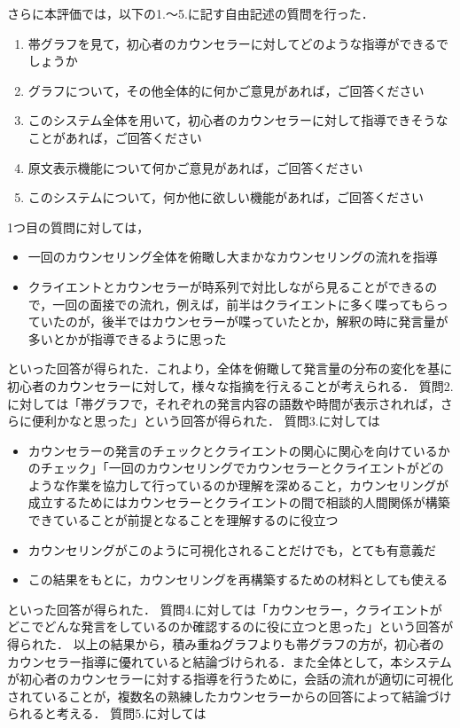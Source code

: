 \documentclass[shuuron]{kuee}
\begin{document}
さらに本評価では，以下の1.〜5.に記す自由記述の質問を行った．

\begin{enumerate}
  \item 帯グラフを見て，初心者のカウンセラーに対してどのような指導ができるでしょうか
  \item グラフについて，その他全体的に何かご意見があれば，ご回答ください
  \item このシステム全体を用いて，初心者のカウンセラーに対して指導できそうなことがあれば，ご回答ください
  \item 原文表示機能について何かご意見があれば，ご回答ください
  \item このシステムについて，何か他に欲しい機能があれば，ご回答ください
\end{enumerate}

1つ目の質問に対しては，
\begin{itemize}

  \item 一回のカウンセリング全体を俯瞰し大まかなカウンセリングの流れを指導
  \item クライエントとカウンセラーが時系列で対比しながら見ることができるので，一回の面接での流れ，例えば，前半はクライエントに多く喋ってもらっていたのが，後半ではカウンセラーが喋っていたとか，解釈の時に発言量が多いとかが指導できるように思った
\end{itemize}
といった回答が得られた．これより，全体を俯瞰して発言量の分布の変化を基に初心者のカウンセラーに対して，様々な指摘を行えることが考えられる．
質問2.に対しては「帯グラフで，それぞれの発言内容の語数や時間が表示されれば，さらに便利かなと思った」という回答が得られた．
質問3.に対しては

\begin{itemize}

  \item カウンセラーの発言のチェックとクライエントの関心に関心を向けているかのチェック」「一回のカウンセリングでカウンセラーとクライエントがどのような作業を協力して行っているのか理解を深めること，カウンセリングが成立するためにはカウンセラーとクライエントの間で相談的人間関係が構築できていることが前提となることを理解するのに役立つ
  \item カウンセリングがこのように可視化されることだけでも，とても有意義だ
  \item この結果をもとに，カウンセリングを再構築するための材料としても使える
\end{itemize}
といった回答が得られた．
質問4.に対しては「カウンセラー，クライエントがどこでどんな発言をしているのか確認するのに役に立つと思った」という回答が得られた．
以上の結果から，積み重ねグラフよりも帯グラフの方が，初心者のカウンセラー指導に優れていると結論づけられる．また全体として，本システムが初心者のカウンセラーに対する指導を行うために，会話の流れが適切に可視化されていることが，複数名の熟練したカウンセラーからの回答によって結論づけられると考える．
質問5.に対しては
\end{document}
